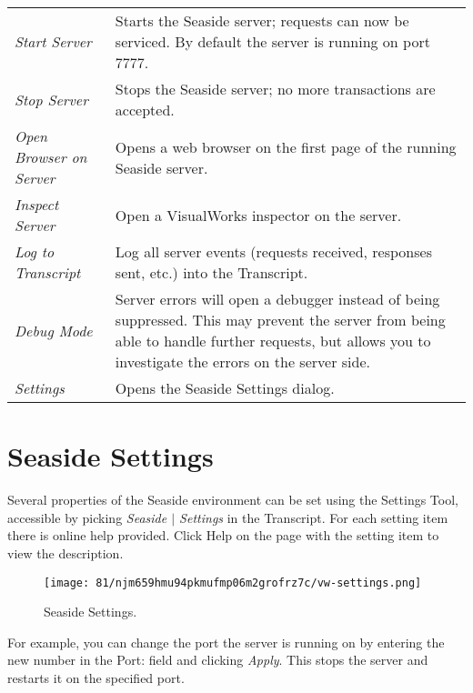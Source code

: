 \documentclass[a4paper,10pt,twoside]{book}
\begin{document}
\begin{tabularx}{\textwidth}{lX}
 \textit{Start Server} & Starts the Seaside server; requests can now be serviced. By default the server is running on port 7777.\\
 \textit{Stop Server} & Stops the Seaside server; no more transactions are accepted.\\
 \textit{Open Browser on Server} & Opens a web browser on the first page of the running Seaside server. \\
 \textit{Inspect Server} & Open a VisualWorks inspector on the server.\\
 \textit{Log to Transcript} & Log all server events (requests received, responses sent, etc.) into the Transcript.\\
 \textit{Debug Mode} & Server errors will open a debugger instead of being  suppressed. This may prevent the server from being able to handle further requests, but allows you to investigate the errors on the server side. \\
 \textit{Settings} & Opens the Seaside Settings dialog.\\
\end{tabularx}

\section{Seaside Settings}
\label{book:gettingstarted:cincomsmalltalk:settings}

Several properties of the Seaside environment can be set using the Settings Tool, accessible by picking \textit{Seaside $|$ Settings} in the Transcript. For each setting item there is online help provided. Click Help on the page with the setting item to view the description.

\begin{figure}[h!tbp]
	\begin{center}
		\texttt{[image: 81/njm659hmu94pkmufmp06m2grofrz7c/vw-settings.png]}
		\caption{Seaside Settings.\label{book:gettingstarted:cincomsmalltalk:settings:vwsettings}}
	\end{center}
\end{figure}

  
For example, you can change the port the server is running on by entering the new number in the Port: field and clicking \textit{Apply}. This stops the server and restarts it on the specified port.

\end{document}
